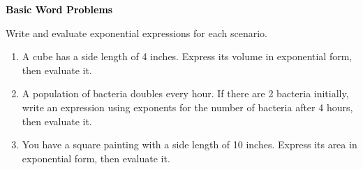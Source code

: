 \documentclass[12pt, letterpaper, fleqn]{article}
\begin{document}
\newpage

\begin{tcolorbox}[colback=black!10]
\large\textcolor{black}{\textbf{Basic Word Problems}}
\end{tcolorbox}

\noindent
Write and evaluate exponential expressions for each scenario.

\vspace{3mm}

\begin{enumerate}[itemsep=2.2cm, leftmargin=0.6cm]

\item A cube has a side length of 4 inches. Express its volume in exponential form, then evaluate it.

\vspace{2.2cm}

\item A population of bacteria doubles every hour. If there are 2 bacteria initially, write an expression using exponents for the number of bacteria after 4 hours, then evaluate it.

\vspace{2.2cm}

\item You have a square painting with a side length of 10 inches. Express its area in exponential form, then evaluate it.

\vspace{2.2cm}

\end{enumerate}
\end{document}

